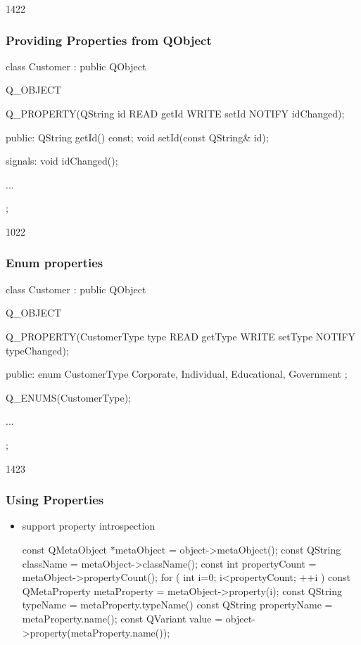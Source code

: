 \begin{slide}[fragile]{1422}
\frametitle{Providing Properties from QObject}
\begin{cpp}
class Customer : public QObject
{
    Q_OBJECT

    Q_PROPERTY(QString id READ getId WRITE setId NOTIFY idChanged);

  public:
     QString getId() const;
     void setId(const QString& id);
  
  signals:
     void idChanged();

  ...
};
\end{cpp}
\end{slide}

\begin{slide}[fragile]{1022}
\frametitle{Enum properties}
\begin{cpp}
class Customer : public QObject
{
    Q_OBJECT

    Q_PROPERTY(CustomerType type READ getType WRITE setType 
               NOTIFY typeChanged);

  public:
    enum CustomerType {
      Corporate, Individual, Educational, Government
    };

    Q_ENUMS(CustomerType);
    
  ...
};
\end{cpp}
\end{slide}

\begin{slide}[fragile]{1423}
\frametitle{Using Properties}
\begin{itemize}
\item {} support property introspection\smallskip
  \begin{cpp}
  const QMetaObject *metaObject = object->metaObject();
  const QString className = metaObject->className();
  const int propertyCount = metaObject->propertyCount();
  for ( int i=0; i<propertyCount; ++i ) {
    const QMetaProperty metaProperty = metaObject->property(i);
    const QString typeName = metaProperty.typeName()
    const QString propertyName = metaProperty.name();
    const QVariant value = object->property(metaProperty.name());
  }
  \end{cpp}
\end{itemize}
\end{slide}
